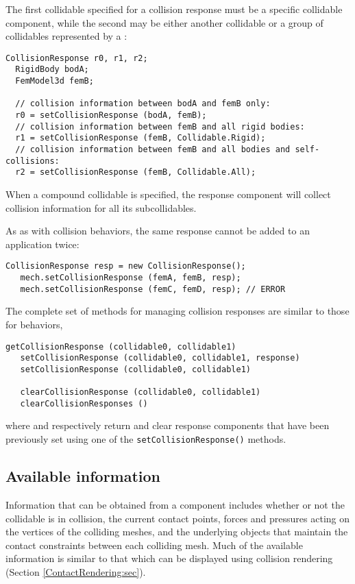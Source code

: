 The first collidable specified for a collision response
must be a specific collidable component, while the second may be either another
collidable or a group of collidables represented by a
:
%
\begin{lstlisting}[]
  CollisionResponse r0, r1, r2;
  RigidBody bodA;
  FemModel3d femB;

  // collision information between bodA and femB only:
  r0 = setCollisionResponse (bodA, femB); 
  // collision information between femB and all rigid bodies:
  r1 = setCollisionResponse (femB, Collidable.Rigid); 
  // collision information between femB and all bodies and self-collisions:
  r2 = setCollisionResponse (femB, Collidable.All); 
\end{lstlisting}
%
When a compound collidable is specified, the response component will
collect collision information for all its subcollidables.

As as with collision behaviors, the same response cannot be added to
an application twice:
%
\begin{lstlisting}[]
   CollisionResponse resp = new CollisionResponse();
   mech.setCollisionResponse (femA, femB, resp);
   mech.setCollisionResponse (femC, femD, resp); // ERROR
\end{lstlisting}
%

The complete set of methods for managing collision responses are
similar to those for behaviors,
%
\begin{lstlisting}[]
   getCollisionResponse (collidable0, collidable1)
   setCollisionResponse (collidable0, collidable1, response)
   setCollisionResponse (collidable0, collidable1)

   clearCollisionResponse (collidable0, collidable1)
   clearCollisionResponses ()
\end{lstlisting}
%
where
and
respectively return and clear response components that have been
previously set using one of the {\tt setCollisionResponse()} methods.

\subsection{Available information}

Information that can be obtained from a
 component
includes whether or not the collidable is in collision, the current
contact points, forces and pressures acting on the vertices of the
colliding meshes, and the
underlying 
objects that maintain the contact constraints between each colliding
mesh. Much of the available information is similar to that which can
be displayed using collision rendering
(Section \ref{ContactRendering:sec}).

